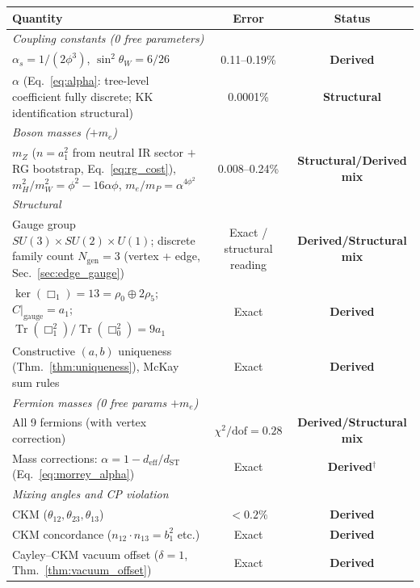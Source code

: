 \documentclass[12pt,a4paper]{article}
\theoremstyle{definition}
\begin{document}
\begin{table}[H]
\centering\footnotesize
\begin{tabular}{lcc}
\toprule
\textbf{Quantity} & \textbf{Error} & \textbf{Status} \\
\midrule
\multicolumn{3}{l}{\textit{Coupling constants (0 free parameters)}} \\
$\alpha_s = 1/(2\phi^3)$, $\sin^2\theta_W = 6/26$ & 0.11--0.19\% & \textbf{Derived} \\
$\alpha$ (Eq.~\ref{eq:alpha}: tree-level coefficient fully discrete; KK identification structural) & 0.0001\% & \textbf{Structural} \\
\midrule
\multicolumn{3}{l}{\textit{Boson masses ($+m_e$)}} \\
$m_Z$ ($n\!=\!a_1^2$ from neutral IR sector $+$ RG bootstrap, Eq.~\ref{eq:rg_cost}), $m_H^2/m_W^2 = \phi^2 - 16\alpha\phi$, $m_e/m_P = \alpha^{4\phi^2}$ & 0.008--0.24\% & \textbf{Structural/Derived mix} \\
\midrule
\multicolumn{3}{l}{\textit{Structural}} \\
Gauge group $SU(3) \times SU(2) \times U(1)$; discrete family count $N_{\text{gen}} = 3$ (vertex + edge, Sec.~\ref{sec:edge_gauge}) & Exact / structural reading & \textbf{Derived/Structural mix} \\
$\ker(\Box_1) = 13 = \rho_0 \oplus 2\rho_5$; $C|_{\text{gauge}} = a_1$; $\operatorname{Tr}(\Box_1^2)/\operatorname{Tr}(\Box_0^2) = 9a_1$ & Exact & \textbf{Derived} \\
Constructive $(a,b)$ uniqueness (Thm.~\ref{thm:uniqueness}), McKay sum rules & Exact & \textbf{Derived} \\
\midrule
\multicolumn{3}{l}{\textit{Fermion masses (0 free params $+ m_e$)}} \\
All 9 fermions (with vertex correction) & $\chi^2/\text{dof} = 0.28$ & \textbf{Derived/Structural mix} \\
Mass corrections: $\alpha = 1 - d_{\text{eff}}/d_{\text{ST}}$ (Eq.~\ref{eq:morrey_alpha}) & Exact & \textbf{Derived}$^\dagger$ \\
\midrule
\multicolumn{3}{l}{\textit{Mixing angles and CP violation}} \\
CKM ($\theta_{12}, \theta_{23}, \theta_{13}$) & $<0.2\%$ & \textbf{Derived} \\
CKM concordance ($n_{12}\!\cdot\! n_{13} = b_1^2$ etc.) & Exact & \textbf{Derived} \\
Cayley--CKM vacuum offset ($\delta = 1$, Thm.~\ref{thm:vacuum_offset}) & Exact & \textbf{Derived} \\

\end{tabular}
\end{table}
\end{document}
